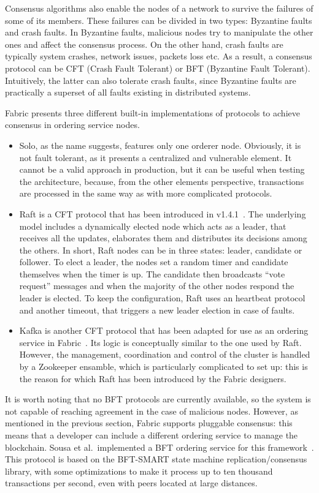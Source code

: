Consensus algorithms also enable the nodes of a network to survive the failures of some of its members. These failures can be divided in two types: Byzantine faults and crash faults. In Byzantine faults, malicious nodes try to manipulate the other ones and affect the consensus process. On the other hand, crash faults are typically system crashes, network issues, packets loss etc. As a result, a consensus protocol can be CFT (Crash Fault Tolerant) or BFT (Byzantine Fault Tolerant). Intuitively, the latter can also tolerate crash faults, since Byzantine faults are practically a superset of all faults existing in distributed systems.

Fabric presents three different built-in implementations of protocols to achieve consensus in ordering service nodes.
\begin{itemize}
    \item Solo, as the name suggests, features only one orderer node. Obviously, it is not fault tolerant, as it presents a centralized and vulnerable element. It cannot be a valid approach in production, but it can be useful when testing the architecture, because, from the other elements perspective, transactions are processed in the same way as with more complicated protocols. 
    \item Raft is a CFT protocol that has been introduced in v1.4.1~\cite{raft}. The underlying model includes a dynamically elected node which acts as a leader, that receives all the updates, elaborates them and distributes its decisions among the others. In short, Raft nodes can be in three states: leader, candidate or follower. To elect a leader, the nodes set a random timer and candidate themselves when the timer is up. The candidate then broadcasts ``vote request'' messages and when the majority of the other nodes respond the leader is elected. To keep the configuration, Raft uses an heartbeat protocol and another timeout, that triggers a new leader election in case of faults.
    \item Kafka is another CFT protocol that has been adapted for use as an ordering service in Fabric~\cite{kafka}. Its logic is conceptually similar to the one used by Raft. However, the management, coordination and control of the cluster is handled by a Zookeeper ensamble, which is particularly complicated to set up: this is the reason for which Raft has been introduced by the Fabric designers.
\end{itemize}

It is worth noting that no BFT protocols are currently available, so the system is not capable of reaching agreement in the case of malicious nodes. However, as mentioned in the previous section, Fabric supports pluggable consensus: this means that a developer can include a different ordering service to manage the blockchain. Sousa et al.\ implemented a BFT ordering service for this framework~\cite{bft_fabric}. This protocol is based on the BFT-SMART state machine replication/consensus library, with some optimizations to make it process up to ten thousand transactions per second, even with peers located at large distances. 

